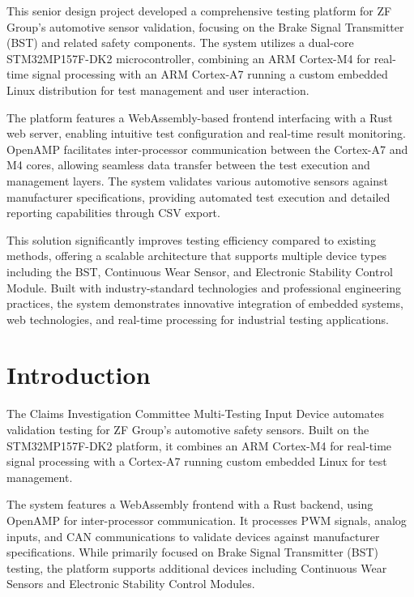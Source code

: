 \documentclass[12pt]{article}
\begin{document}
This senior design project developed a comprehensive testing platform for ZF Group's 
automotive sensor validation, focusing on the Brake Signal Transmitter (BST) and 
related safety components. The system utilizes a dual-core STM32MP157F-DK2 
microcontroller, combining an ARM Cortex-M4 for real-time signal processing with 
an ARM Cortex-A7 running a custom embedded Linux distribution for test management 
and user interaction.

The platform features a WebAssembly-based frontend interfacing with a Rust web 
server, enabling intuitive test configuration and real-time result monitoring. 
OpenAMP facilitates inter-processor communication between the Cortex-A7 and M4 
cores, allowing seamless data transfer between the test execution and management 
layers. The system validates various automotive sensors against manufacturer 
specifications, providing automated test execution and detailed reporting 
capabilities through CSV export.

This solution significantly improves testing efficiency compared to existing methods, 
offering a scalable architecture that supports multiple device types including the 
BST, Continuous Wear Sensor, and Electronic Stability Control Module. Built with 
industry-standard technologies and professional engineering practices, the system 
demonstrates innovative integration of embedded systems, web technologies, and 
real-time processing for industrial testing applications.

\section{Introduction}
The Claims Investigation Committee Multi-Testing Input Device automates validation 
testing for ZF Group's automotive safety sensors. Built on the STM32MP157F-DK2 
platform, it combines an ARM Cortex-M4 for real-time signal processing with a 
Cortex-A7 running custom embedded Linux for test management.

The system features a WebAssembly frontend with a Rust backend, using OpenAMP for 
inter-processor communication. It processes PWM signals, analog inputs, and CAN 
communications to validate devices against manufacturer specifications. While 
primarily focused on Brake Signal Transmitter (BST) testing, the platform supports 
additional devices including Continuous Wear Sensors and Electronic Stability 
Control Modules.
\end{document}
